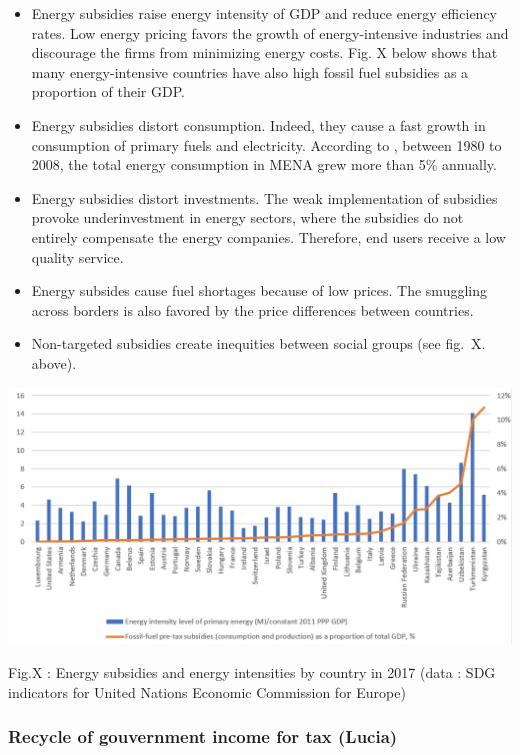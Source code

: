 \documentclass[
]{article}
\providecommand{\tightlist}{%
  \setlength{\itemsep}{0pt}\setlength{\parskip}{0pt}}
\begin{document}
\begin{itemize}
\tightlist
\item
  Energy subsidies raise energy intensity of GDP and reduce energy
  efficiency rates. Low energy pricing favors the growth of
  energy-intensive industries and discourage the firms from minimizing
  energy costs. Fig. X below shows that many energy-intensive countries
  have also high fossil fuel subsidies as a proportion of their GDP.
\item
  Energy subsidies distort consumption. Indeed, they cause a fast growth
  in consumption of primary fuels and electricity. According to
  \textcite{fattouh2013}, between 1980 to 2008, the total energy
  consumption in MENA grew more than 5\% annually.
\item
  Energy subsidies distort investments. The weak implementation of
  subsidies provoke underinvestment in energy sectors, where the
  subsidies do not entirely compensate the energy companies. Therefore,
  end users receive a low quality service.
\item
  Energy subsides cause fuel shortages because of low prices. The
  smuggling across borders is also favored by the price differences
  between countries.
\item
  Non-targeted subsidies create inequities between social groups (see
  fig.~X. above).
\end{itemize}

\includegraphics{Images/Subsidies - energy intensity.jpg}

Fig.X : Energy subsidies and energy intensities by country in 2017 (data
: SDG indicators for United Nations Economic Commission for Europe)

\hypertarget{recycle-of-gouvernment-income-for-tax-lucia}{%
\subsubsection{Recycle of gouvernment income for tax
(Lucia)}\label{recycle-of-gouvernment-income-for-tax-lucia}}
\end{document}
